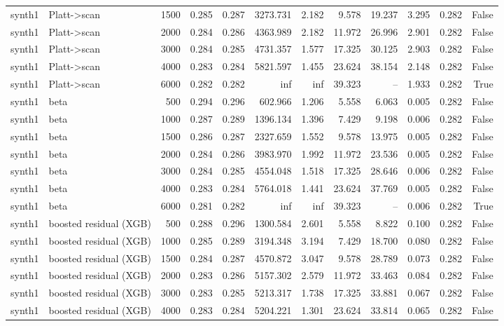 \begin{tabular}{llrrrrrrrrrr}
synth1 & Platt->scan & 1500 & 0.285 & 0.287 & 3273.731 & 2.182 & 9.578 & 19.237 & 3.295 & 0.282 & False \\
synth1 & Platt->scan & 2000 & 0.284 & 0.286 & 4363.989 & 2.182 & 11.972 & 26.996 & 2.901 & 0.282 & False \\
synth1 & Platt->scan & 3000 & 0.284 & 0.285 & 4731.357 & 1.577 & 17.325 & 30.125 & 2.903 & 0.282 & False \\
synth1 & Platt->scan & 4000 & 0.283 & 0.284 & 5821.597 & 1.455 & 23.624 & 38.154 & 2.148 & 0.282 & False \\
synth1 & Platt->scan & 6000 & 0.282 & 0.282 & inf & inf & 39.323 & -- & 1.933 & 0.282 & True \\
synth1 & beta & 500 & 0.294 & 0.296 & 602.966 & 1.206 & 5.558 & 6.063 & 0.005 & 0.282 & False \\
synth1 & beta & 1000 & 0.287 & 0.289 & 1396.134 & 1.396 & 7.429 & 9.198 & 0.006 & 0.282 & False \\
synth1 & beta & 1500 & 0.286 & 0.287 & 2327.659 & 1.552 & 9.578 & 13.975 & 0.005 & 0.282 & False \\
synth1 & beta & 2000 & 0.284 & 0.286 & 3983.970 & 1.992 & 11.972 & 23.536 & 0.005 & 0.282 & False \\
synth1 & beta & 3000 & 0.284 & 0.285 & 4554.048 & 1.518 & 17.325 & 28.646 & 0.006 & 0.282 & False \\
synth1 & beta & 4000 & 0.283 & 0.284 & 5764.018 & 1.441 & 23.624 & 37.769 & 0.005 & 0.282 & False \\
synth1 & beta & 6000 & 0.281 & 0.282 & inf & inf & 39.323 & -- & 0.006 & 0.282 & True \\
synth1 & boosted residual (XGB) & 500 & 0.288 & 0.296 & 1300.584 & 2.601 & 5.558 & 8.822 & 0.100 & 0.282 & False \\
synth1 & boosted residual (XGB) & 1000 & 0.285 & 0.289 & 3194.348 & 3.194 & 7.429 & 18.700 & 0.080 & 0.282 & False \\
synth1 & boosted residual (XGB) & 1500 & 0.284 & 0.287 & 4570.872 & 3.047 & 9.578 & 28.789 & 0.073 & 0.282 & False \\
synth1 & boosted residual (XGB) & 2000 & 0.283 & 0.286 & 5157.302 & 2.579 & 11.972 & 33.463 & 0.084 & 0.282 & False \\
synth1 & boosted residual (XGB) & 3000 & 0.283 & 0.285 & 5213.317 & 1.738 & 17.325 & 33.881 & 0.067 & 0.282 & False \\
synth1 & boosted residual (XGB) & 4000 & 0.283 & 0.284 & 5204.221 & 1.301 & 23.624 & 33.814 & 0.065 & 0.282 & False \\

\end{tabular}
